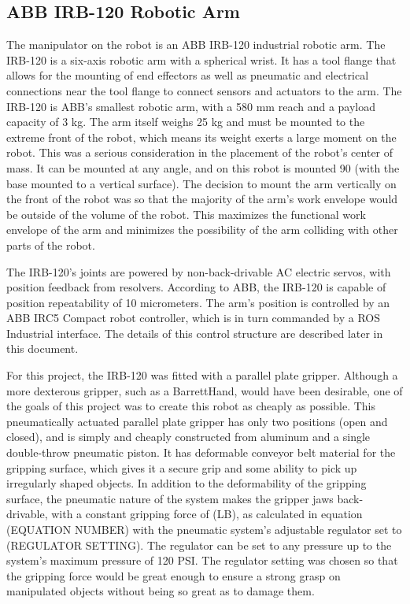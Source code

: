 \documentclass{article}
\begin{document}
\subsection[ABB IRB{}-120 Robotic Arm]{ABB IRB-120 Robotic Arm}
The manipulator on the robot is an ABB IRB-120 industrial robotic arm. The IRB-120 is a six-axis robotic arm with a spherical wrist. It has a tool flange that allows for the mounting of end effectors as well as pneumatic and electrical connections near the tool flange to connect sensors and actuators to the arm. The IRB-120 is ABB{\textquoteright}s smallest robotic arm, with a 580 mm reach and a payload capacity of 3 kg. The arm itself weighs 25 kg and must be mounted to the extreme front of the robot, which means its weight exerts a large moment on the robot. This was a serious consideration in the placement of the robot{\textquoteright}s center of mass. It can be mounted at any angle, and on this robot is mounted 90{\textdegree} (with the base mounted to a vertical surface). The decision to mount the arm vertically on the front of the robot was so that the majority of the arm{\textquoteright}s work envelope would be outside of the volume of the robot. This maximizes the functional work envelope of the arm and minimizes the possibility of the arm colliding with other parts of the robot.

The IRB-120{\textquoteright}s joints are powered by non-back-drivable AC electric servos, with position feedback from resolvers. According to ABB, the IRB-120 is capable of position repeatability of 10 micrometers. The arm{\textquoteright}s position is controlled by an ABB IRC5 Compact robot controller, which is in turn commanded by a ROS Industrial interface. The details of this control structure are described later in this document.

For this project, the IRB-120 was fitted with a parallel plate gripper. Although a more dexterous gripper, such as a BarrettHand, would have been desirable, one of the goals of this project was to create this robot as cheaply as possible. This pneumatically actuated parallel plate gripper has only two positions (open and closed), and is simply and cheaply constructed from aluminum and a single double-throw pneumatic piston. It has deformable conveyor belt material for the gripping surface, which gives it a secure grip and some ability to pick up irregularly shaped objects. In addition to the deformability of the gripping surface, the pneumatic nature of the system makes the gripper jaws back-drivable, with a constant gripping force of (LB), as calculated in equation (EQUATION NUMBER) with the pneumatic system{\textquoteright}s adjustable regulator set to (REGULATOR SETTING). The regulator can be set to any pressure up to the system{\textquoteright}s maximum pressure of 120 PSI. The regulator setting was chosen so that the gripping force would be great enough to ensure a strong grasp on manipulated objects without being so great as to damage them.
\end{document}
